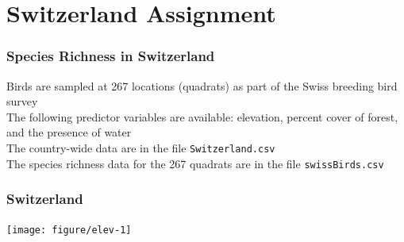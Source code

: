 \documentclass[color=usenames,dvipsnames]{beamer}\usepackage[]{graphicx}\usepackage[]{color}
\begin{document}













\section{Switzerland Assignment}




\begin{frame}
  \centering \Huge \color{blue}{Assignment} \par
\end{frame}



\begin{frame}[fragile]
  \frametitle{Species Richness in Switzerland}
  \large
  Birds are sampled at 267 locations (quadrats) as part of the
  Swiss breeding bird survey \\
  \vfill
  The following predictor variables are available: elevation,
      percent cover of forest, and the presence of water \\
  \vfill
  The country-wide data are in the file {\tt Switzerland.csv} \\
  \vfill
  The species richness data for the 267 quadrats are in the
      file {\tt swissBirds.csv}
\end{frame}




\begin{frame}[fragile]
  \frametitle{Switzerland}
  \tiny

\texttt{[image: figure/elev-1]}
\end{frame}
\end{document}
